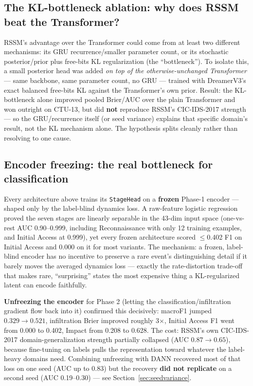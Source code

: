 \documentclass[11pt]{article}
\newcommand{\good}{\textcolor{green!45!black}}
\newcommand{\bad}{\textcolor{red!55!black}}
\newcommand{\code}[1]{\texttt{#1}}
\begin{document}
\subsection{The KL-bottleneck ablation: why does RSSM beat the Transformer?}

RSSM's advantage over the Transformer could come from at least two different mechanisms: its
GRU recurrence/smaller parameter count, or its stochastic posterior/prior plus free-bits KL
regularization (the ``bottleneck''). To isolate this, a small posterior head was added
\emph{on top of the otherwise-unchanged Transformer} --- same backbone, same parameter count, no
GRU --- trained with DreamerV3's exact balanced free-bits KL against the Transformer's own
prior. Result: the KL-bottleneck alone improved pooled Brier/AUC over the plain Transformer and
won outright on CTU-13, but did \textbf{not} reproduce RSSM's CIC-IDS-2017 strength --- so the
GRU/recurrence itself (or seed variance) explains that specific domain's result, not the KL
mechanism alone. The hypothesis splits cleanly rather than resolving to one cause.

\subsection{Encoder freezing: the real bottleneck for classification}
\label{sec:unfreezing}

Every architecture above trains its \code{StageHead} on a \textbf{frozen} Phase-1 encoder ---
shaped only by the label-blind dynamics loss. A raw-feature logistic regression proved the seven
stages are linearly separable in the 43-dim input space (one-vs-rest AUC 0.90--0.999, including
Reconnaissance with only 12 training examples, and Initial Access at 0.999), yet every frozen
architecture scored $\le$0.402 F1 on Initial Access and $0.000$ on it for most variants. The
mechanism: a frozen, label-blind encoder has no incentive to preserve a rare event's
distinguishing detail if it barely moves the averaged dynamics loss --- exactly the
rate-distortion trade-off that makes rare, ``surprising'' states the most expensive thing a
KL-regularized latent can encode faithfully.

\textbf{Unfreezing the encoder} for Phase 2 (letting the classification/infiltration gradient
flow back into it) confirmed this decisively: macroF1 jumped $0.329 \to 0.521$, infiltration
Brier improved roughly 3$\times$, Initial Access F1 went from \bad{0.000} to \good{0.402}, Impact
from \bad{0.208} to \good{0.628}. The cost: RSSM's own CIC-IDS-2017 domain-generalization
strength partially collapsed (AUC $0.87 \to 0.65$), because fine-tuning on labels pulls the
representation toward whatever the label-heavy domains need. Combining unfreezing with DANN
recovered most of that loss on one seed (AUC up to 0.83) but the recovery \textbf{did not
replicate} on a second seed (AUC 0.19--0.30) --- see Section~\ref{sec:seedvariance}.
\end{document}

